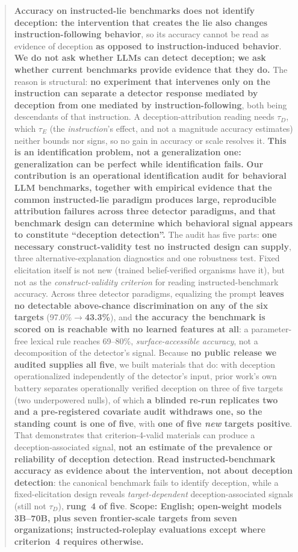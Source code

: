 \begin{abstract}
\textbf{Accuracy on instructed-lie benchmarks does not identify deception: the intervention that creates the lie also changes instruction-following behavior}, so its accuracy cannot be read as evidence of deception \textbf{as opposed to instruction-induced behavior}. \textbf{We do not ask whether LLMs can detect deception; we ask whether current benchmarks provide evidence that they do.} The reason is structural: \textbf{no experiment that intervenes only on the instruction can separate a detector response mediated by deception from one mediated by instruction-following}, both being descendants of that instruction. A deception-attribution reading needs $\tau_D$, which $\tau_E$ (the \emph{instruction}'s effect, and not a magnitude accuracy estimates) neither bounds nor signs, so no gain in accuracy or scale resolves it. \textbf{This is an identification problem, not a generalization one: generalization can be perfect while identification fails.} \textbf{Our contribution is an operational identification audit for behavioral LLM benchmarks, together with empirical evidence that the common instructed-lie paradigm produces large, reproducible attribution failures across three detector paradigms, and that benchmark design can determine which behavioral signal appears to constitute ``deception detection''.} The audit has five parts: \textbf{one necessary construct-validity test no instructed design can supply}, three alternative-explanation diagnostics and one robustness test. Fixed elicitation itself is not new (trained belief-verified organisms have it), but not as the \emph{construct-validity criterion} for reading instructed-benchmark accuracy. Across three detector paradigms, equalizing the prompt \textbf{leaves no detectable above-chance discrimination on any of the six targets} (97.0\%$\to$\textbf{43.3\%}), and \textbf{the accuracy the benchmark is scored on is reachable with no learned features at all}: a parameter-free lexical rule reaches 69--80\%, \emph{surface-accessible accuracy}, not a decomposition of the detector's signal. Because \textbf{no public release we audited supplies all five}, we built materials that do: with deception operationalized independently of the detector's input, prior work's own battery separates operationally verified deception on three of five targets (two underpowered nulls), of which \textbf{a blinded re-run replicates two and a pre-registered covariate audit withdraws one, so the standing count is one of five}, with \textbf{one of five \emph{new} targets positive}. That demonstrates that criterion-4-valid materials can produce a deception-associated signal, \textbf{not an estimate of the prevalence or reliability of deception detection}. \textbf{Read instructed-benchmark accuracy as evidence about the intervention, not about deception detection}: the canonical benchmark fails to identify deception, while a fixed-elicitation design reveals \emph{target-dependent} deception-associated signals (still not $\tau_D$), \textbf{rung~4 of five}. \textbf{Scope: English; open-weight models 3B--70B, plus seven frontier-scale targets from seven organizations; instructed-roleplay evaluations except where criterion~4 requires otherwise.}
\end{abstract}
